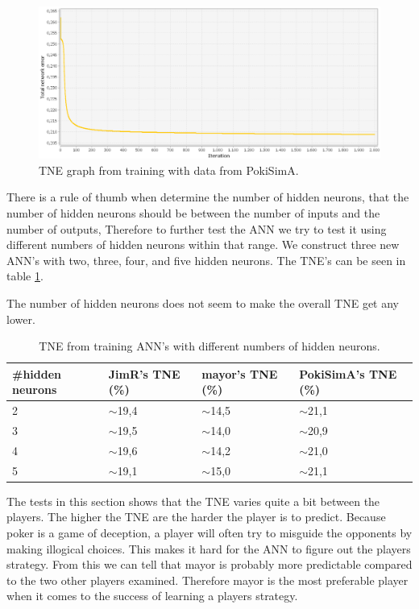 \begin{figure}[H]
  \center
    \includegraphics[scale=0.5]{images/nn/PokiSimA.png}
  \caption{TNE graph from training with data from PokiSimA.\label{fig:pokisima}}
\end{figure}

There is a rule of thumb when determine the number of hidden neurons, that the number of hidden neurons should be between the number of inputs and the number of outputs,
Therefore to further test the ANN we try to test it using different numbers of hidden neurons within that range. We construct three new ANN's with two, three, four, and five hidden neurons. The TNE's can be seen in table \ref{tab:tneg4}. 

The number of hidden neurons does not seem to make the overall TNE get any lower.

\vspace{4mm}
\begin{table}[H]
\center
\begin{tabular}{ | l | l | l | l | }
  \hline
  \#hidden neurons & JimR's TNE (\%) & mayor's TNE (\%) & PokiSimA's TNE (\%) \\
  \hline
  2 & $\sim$19,4 & $\sim$14,5 & $\sim$21,1 \\
  3 & $\sim$19,5 & $\sim$14,0 & $\sim$20,9 \\
  4 & $\sim$19,6 & $\sim$14,2 & $\sim$21,0 \\
  5 & $\sim$19,1 & $\sim$15,0 & $\sim$21,1 \\
  \hline
\end{tabular}
\caption{TNE from training ANN's with different numbers of hidden neurons.\label{tab:tneg4}}
\end{table}
\vspace{4mm}

The tests in this section shows that the TNE varies quite a bit between the players. The higher the TNE are the harder the player is to predict. Because poker is a game of deception, a player will often try to misguide the opponents by making illogical choices. This makes it hard for the ANN to figure out the players strategy.
From this we can tell that mayor is probably more predictable compared to the two other players examined. Therefore mayor is the most preferable player when it comes to the success of learning a players strategy.


